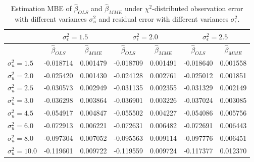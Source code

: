 \documentclass{article}
\begin{document}
\begin{table}[ht]
    \centering
    \caption{Estimation MBE of $\hat{\beta}_{OLS}$ and $\hat{\beta}_{MME}$ under $\chi^2$-distributed observation error with different variances $\sigma^2_u$ and residual error with different variances $\sigma^2_\epsilon$.}
    \label{Tab:MBE_chi}
    \begin{tabular}[t]{lcccccc}
        \hline
        &\multicolumn{2}{c}{$\sigma^2_\epsilon=1.5$}&\multicolumn{2}{c}{$\sigma^2_\epsilon=2.0$}&\multicolumn{2}{c}{$\sigma^2_\epsilon=2.5$}\\
        \hline
        &$\hat{\beta}_{OLS}$&$\hat{\beta}_{MME}$&$\hat{\beta}_{OLS}$&$\hat{\beta}_{MME}$&$\hat{\beta}_{OLS}$&$\hat{\beta}_{MME}$\\
        \hline
        $\sigma^2_u = 1.5$&-0.018714&0.001479&-0.018709&0.001491&-0.018640&0.001558\\
        $\sigma^2_u = 2.0$&-0.025420&0.001430&-0.024128&0.002761&-0.025012&0.001851\\
        $\sigma^2_u = 2.5$&-0.030573&0.002949&-0.031135&0.002355&-0.031329&0.002149\\
        $\sigma^2_u = 3.0$&-0.036298&0.003864&-0.036901&0.003226&-0.037024&0.003085\\
        $\sigma^2_u = 4.5$&-0.054917&0.004847&-0.055502&0.004227&-0.054086&0.005756\\
        $\sigma^2_u = 6.0$&-0.072913&0.006221&-0.072631&0.006482&-0.072691&0.006443\\
        $\sigma^2_u = 8.0$&-0.097304&0.007052&-0.095563&0.009114&-0.097776&0.006451\\
        $\sigma^2_u = 10.0$&-0.119601&0.009722&-0.119559&0.009724&-0.117377&0.012370\\
        \hline
    \end{tabular}
\end{table}
\end{document}
